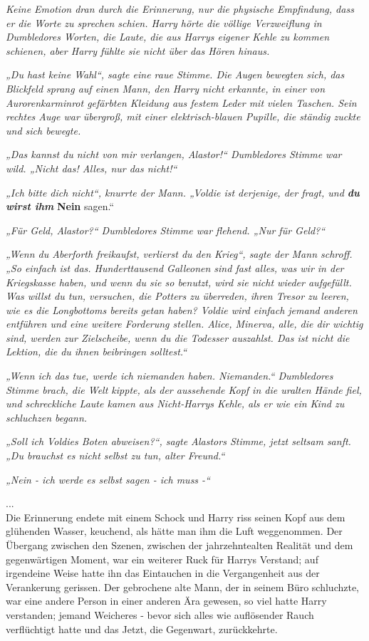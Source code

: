 {\emph{Keine Emotion dran durch die Erinnerung, nur die physische Empfindung, dass er die Worte zu sprechen schien. Harry hörte die völlige Verzweiflung in Dumbledores Worten, die Laute, die aus Harrys eigener Kehle zu kommen schienen, aber Harry fühlte sie nicht über das Hören hinaus.}

\emph{„Du hast keine Wahl“, sagte eine raue Stimme. Die Augen bewegten sich, das Blickfeld sprang auf einen Mann, den Harry nicht erkannte, in einer von Aurorenkarminrot gefärbten Kleidung aus festem Leder mit vielen Taschen. Sein rechtes Auge war übergroß, mit einer elektrisch-blauen Pupille, die ständig zuckte und sich bewegte.}

\emph{„Das kannst du nicht von mir verlangen, Alastor!“ Dumbledores Stimme war wild. „Nicht das! Alles, nur das nicht!“}

\emph{„Ich bitte dich nicht“, knurrte der Mann. „Voldie ist derjenige, der fragt, und \textbf{du wirst ihm}} \textbf{Nein} sagen.“

\emph{„Für Geld, Alastor?“ Dumbledores Stimme war flehend. „Nur für Geld?“}

\emph{„Wenn du Aberforth freikaufst, verlierst du den Krieg“, sagte der Mann schroff. „So einfach ist das. Hunderttausend Galleonen sind fast alles, was wir in der Kriegskasse haben, und wenn du sie so benutzt, wird sie nicht wieder aufgefüllt. Was willst du tun, versuchen, die Potters zu überreden, ihren Tresor zu leeren, wie es die Longbottoms bereits getan haben? Voldie wird einfach jemand anderen entführen und eine weitere Forderung stellen. Alice, Minerva, alle, die dir wichtig sind, werden zur Zielscheibe, wenn du die Todesser auszahlst. Das ist nicht die Lektion, die du ihnen beibringen solltest.“}

\emph{„Wenn ich das tue, werde ich niemanden haben. Niemanden.“ Dumbledores Stimme brach, die Welt kippte, als der aussehende Kopf in die uralten Hände fiel, und schreckliche Laute kamen aus Nicht-Harrys Kehle, als er wie ein Kind zu schluchzen begann.}

\emph{„Soll ich Voldies Boten abweisen?“, sagte Alastors Stimme, jetzt seltsam sanft. „Du brauchst es nicht selbst zu tun, alter Freund.“}

\emph{„Nein - ich werde es selbst sagen - ich muss -“}

...\\ Die Erinnerung endete mit einem Schock und Harry riss seinen Kopf aus dem glühenden Wasser, keuchend, als hätte man ihm die Luft weggenommen. Der Übergang zwischen den Szenen, zwischen der jahrzehntealten Realität und dem gegenwärtigen Moment, war ein weiterer Ruck für Harrys Verstand; auf irgendeine Weise hatte ihn das Eintauchen in die Vergangenheit aus der Verankerung gerissen. Der gebrochene alte Mann, der in seinem Büro schluchzte, war eine andere Person in einer anderen Ära gewesen, so viel hatte Harry verstanden; jemand Weicheres - bevor sich alles wie auflösender Rauch verflüchtigt hatte und das Jetzt, die Gegenwart, zurückkehrte.

}
